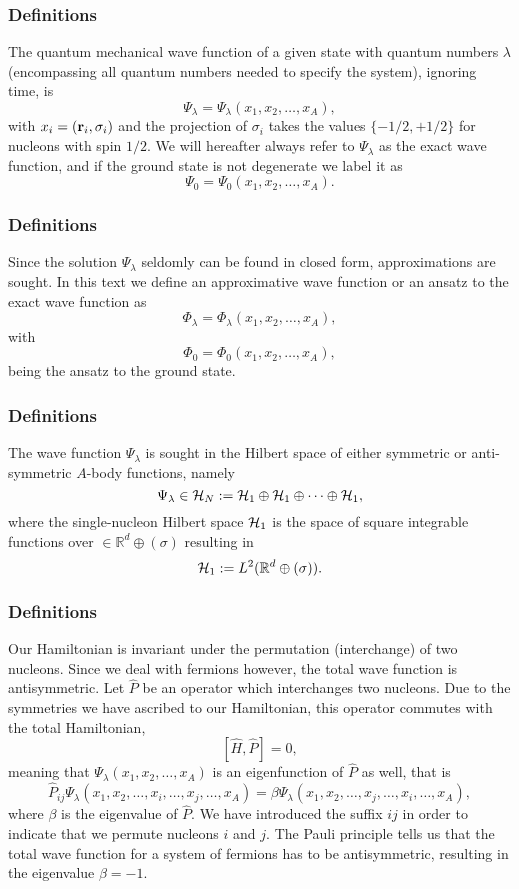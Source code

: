 \documentclass[compress]{beamer}
\begin{document}
\frame
{
\frametitle{Definitions}
The quantum mechanical wave function of a given state with quantum numbers $\lambda$ (encompassing all quantum numbers needed to specify the system), ignoring time, is
\[
\Psi_{\lambda}=\Psi_{\lambda}(x_1,x_2,\dots,x_A),
\]
with $x_i=({\bf r}_i,\sigma_i)$ and the projection of $\sigma_i$ takes the values
$\{-1/2,+1/2\}$ for nucleons with spin $1/2$. 
We will hereafter always refer to $\Psi_{\lambda}$ as the exact wave function, and if the ground state is not degenerate we label it as 
\[
\Psi_0=\Psi_0(x_1,x_2,\dots,x_A).
\]

}


\frame
{
\frametitle{Definitions}
Since the solution $\Psi_{\lambda}$ seldomly can be found in closed form, approximations are sought. In this text we define an approximative wave function or an ansatz to the exact wave function as 
\[
\Phi_{\lambda}=\Phi_{\lambda}(x_1,x_2,\dots,x_A),
\]
with 
\[
\Phi_0=\Phi_0(x_1,x_2,\dots,x_A),
\]
being the ansatz to the ground state.  
}


\frame
{
\frametitle{Definitions}
The wave function $\Psi_{\lambda}$ is sought in the Hilbert space of either symmetric or anti-symmetric $A$-body functions, namely
\[
\Psi_{\lambda}\in {\cal H}_N:= {\cal H}_1\oplus{\cal H}_1\oplus\dots\oplus{\cal H}_1,
\]
where the single-nucleon Hilbert space ${\cal H}_1$ is the space of square integrable functions over
$\in {\mathbb{R}}^{d}\oplus (\sigma)$
resulting in
\[
{\cal H}_1:= L^2(\mathbb{R}^{d}\oplus (\sigma)).
\]
}



\frame
{
\frametitle{Definitions}
Our Hamiltonian is invariant under the permutation (interchange) of two nucleons.
Since we deal with fermions however, the total wave function is antisymmetric.
Let $\hat{P}$ be an operator which interchanges two nucleons.
Due to the symmetries we have ascribed to our Hamiltonian, this operator commutes with the total Hamiltonian,
\[
[\hat{H},\hat{P}] = 0,
\]
meaning that $\Psi_{\lambda}(x_1, x_2, \dots , x_A)$ is an eigenfunction of 
$\hat{P}$ as well, that is
\[
\hat{P}_{ij}\Psi_{\lambda}(x_1, x_2, \dots,x_i,\dots,x_j,\dots,x_A)=
\beta\Psi_{\lambda}(x_1, x_2, \dots,x_j,\dots,x_i,\dots,x_A),
\]
where $\beta$ is the eigenvalue of $\hat{P}$. We have introduced the suffix $ij$ in order to indicate that we permute nucleons $i$ and $j$.
The Pauli principle tells us that the total wave function for a system of fermions
has to be antisymmetric, resulting in the eigenvalue $\beta = -1$.   

}
\end{document}
